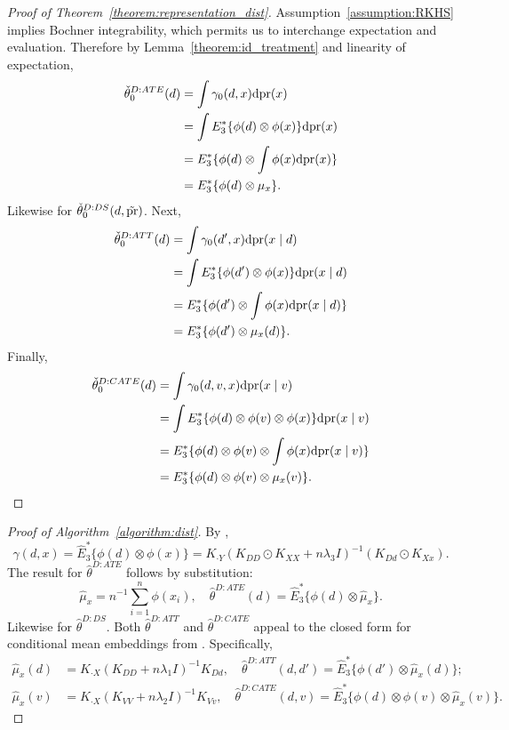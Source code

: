 \begin{proof}[Proof of Theorem~\ref{theorem:representation_dist}]
Assumption~\ref{assumption:RKHS} implies Bochner integrability, which permits us to interchange expectation and evaluation. Therefore by Lemma~\ref{theorem:id_treatment} and linearity of expectation,
    \begin{align*}
   \check{\theta}_0^{D:ATE}(d)&= \int \gamma_0(d,x)\mathrm{d}\text{\normalfont pr}(x)\\
   &=\int E_3^*\{\phi(d)\otimes \phi(x)\} \mathrm{d}\text{\normalfont pr}(x) \\
    &= E_3^*\{\phi(d)\otimes \int \phi(x)\mathrm{d}\text{\normalfont pr}(x)\} \\
    &= E_3^*\{\phi(d)\otimes \mu_x\}.
\end{align*}
Likewise for $\check{\theta}_0^{D:DS}(d,\tilde{\text{\normalfont pr}})$. Next,
    \begin{align*}
   \check{\theta}_0^{D:ATT}(d)&= \int \gamma_0(d',x)\mathrm{d}\text{\normalfont pr}(x \mid d)\\
   &=\int E_3^*\{\phi(d')\otimes \phi(x)\} \mathrm{d}\text{\normalfont pr}(x \mid d) \\
    &= E_3^*\{\phi(d')\otimes \int \phi(x)\mathrm{d}\text{\normalfont pr}(x \mid d)\}  \\
    &= E_3^*\{\phi(d')\otimes \mu_x(d)\}. 
\end{align*}
Finally,
    \begin{align*}
   \check{\theta}_0^{D:CATE}(d)&= \int \gamma_0(d,v,x)\mathrm{d}\text{\normalfont pr}(x \mid v) \\
   &=\int E_3^*\{\phi(d)\otimes \phi(v)\otimes \phi(x)\} \mathrm{d}\text{\normalfont pr}(x \mid v) \\
    &= E_3^*\{\phi(d)\otimes \phi(v)\otimes \int \phi(x)\mathrm{d}\text{\normalfont pr}(x \mid v)\}  \\
    &= E_3^*\{\phi(d)\otimes \phi(v) \otimes \mu_x(v)\}.
\end{align*}
\end{proof}

\begin{proof}[Proof of Algorithm~\ref{algorithm:dist}]
By \cite[Algorithm 1]{singh2019kernel},
$$
\hat{\gamma}(d,x)=\hat{E}_3^*\{\phi(d)\otimes \phi(x)\}=K_{\cdot Y}(K_{DD}\odot K_{XX}+n\lambda_3 I )^{-1}(K_{Dd}\odot K_{Xx}).
$$
The result for $\hat{\theta}^{D:ATE}$ follows by substitution: 
$$
\hat{\mu}_x=n^{-1}\sum_{i=1}^n \phi(x_i),\quad \hat{\theta}^{D:ATE}(d)=\hat{E}_3^*\{\phi(d)\otimes \hat{\mu}_x\}.
$$
Likewise for $\hat{\theta}^{D:DS}$. Both $ \hat{\theta}^{D:ATT}$ and $\hat{\theta}^{D:CATE}$ appeal to the closed form for conditional mean embeddings from \cite[Algorithm 1]{singh2019kernel}. Specifically,
\begin{align*}
     \hat{\mu}_x(d)&=K_{\cdot X}(K_{DD}+n\lambda_1 I )^{-1}K_{Dd},\quad \hat{\theta}^{D:ATT}(d,d')=\hat{E}_3^*\{\phi(d')\otimes \hat{\mu}_x(d)\}; \\
         \hat{\mu}_{x}(v)&=K_{\cdot X}(K_{VV}+n\lambda_2 I )^{-1}K_{Vv},\quad \hat{\theta}^{D:CATE}(d,v)=\hat{E}_3^*\{\phi(d)\otimes \phi(v)\otimes \hat{\mu}_{x}(v)\}.
\end{align*}
\end{proof}

